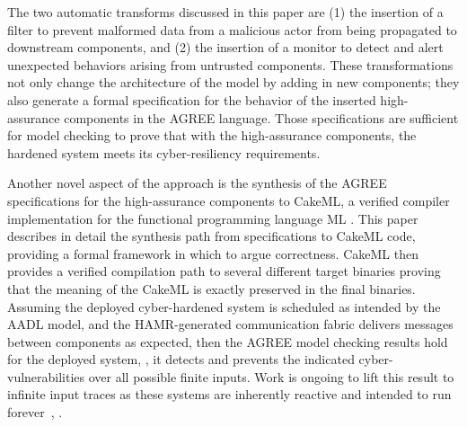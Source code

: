 
The two automatic transforms discussed in this paper are (1) the insertion of a filter to prevent malformed data from a malicious actor from being propagated to downstream components, and (2) the insertion of a monitor to detect and alert unexpected behaviors arising from untrusted components. These transformations not only change the architecture of the model by adding in new components; they also generate a formal specification for the behavior of the inserted high-assurance components in the AGREE language. Those specifications are sufficient for model checking to prove that with the high-assurance components, the hardened system meets its cyber-resiliency requirements.

Another novel aspect of the approach is the synthesis of the AGREE specifications for the high-assurance components to CakeML, a verified compiler implementation for the functional programming language ML \cite{cakeml}. This paper describes in detail the synthesis path from specifications to CakeML code, providing a formal framework in which to argue correctness. CakeML then provides a verified compilation path to several different target binaries proving that the meaning of the CakeML is exactly preserved in the final binaries. Assuming the deployed cyber-hardened system is scheduled as intended by the AADL model, and the HAMR-generated communication fabric delivers messages between components as expected, then the AGREE model checking results hold for the deployed system, \ie, it detects and prevents the indicated cyber-vulnerabilities over all possible finite inputs. Work is ongoing to lift this result to infinite input traces as these systems are inherently reactive and intended to run forever~\cite{case-verified-filter}, \cite{cakeml-space-cost}.

